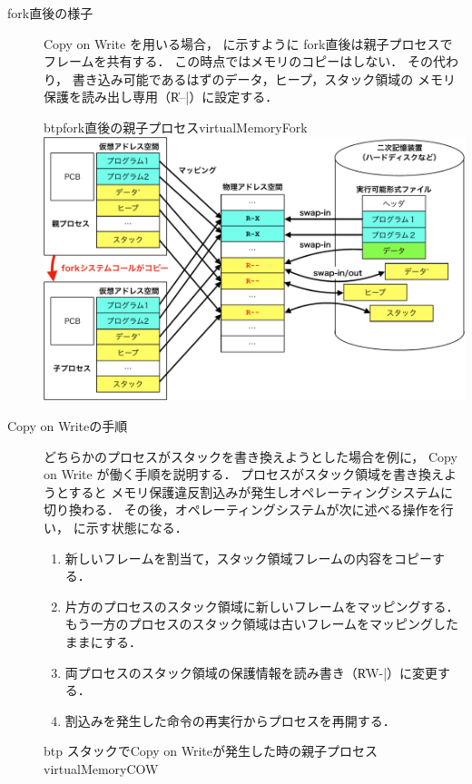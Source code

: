 \begin{description}
\item[fork直後の様子]
  Copy on Write を用いる場合，
  に示すように
  fork直後は親子プロセスでフレームを共有する．
  この時点ではメモリのコピーはしない．
  その代わり，
  書き込み可能であるはずのデータ，ヒープ，スタック領域の
  メモリ保護を読み出し専用（\|R--|）に設定する．
  \begin{myfig}{btp}{fork直後の親子プロセス}{virtualMemoryFork}
    \includegraphics[scale=0.66]{Fig/virtualMemoryFork-crop.pdf}
  \end{myfig}
\item[Copy on Writeの手順]
  どちらかのプロセスがスタックを書き換えようとした場合を例に，
  Copy on Write が働く手順を説明する．
  プロセスがスタック領域を書き換えようとすると
  メモリ保護違反割込みが発生しオペレーティングシステムに切り換わる．
  その後，オペレーティングシステムが次に述べる操作を行い，
  に示す状態になる．
  \begin{enumerate}
  \item 新しいフレームを割当て，スタック領域フレームの内容をコピーする．
  \item 片方のプロセスのスタック領域に新しいフレームをマッピングする．
    もう一方のプロセスのスタック領域は古いフレームをマッピングしたままにする．
  \item 両プロセスのスタック領域の保護情報を読み書き（\|RW-|）に変更する．
  \item 割込みを発生した命令の再実行からプロセスを再開する．
  \end{enumerate}
  \begin{myfig}{btp}
    {スタックでCopy on Writeが発生した時の親子プロセス}{virtualMemoryCOW}

\end{myfig}
\end{description}
